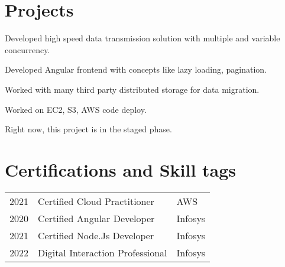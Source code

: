 \documentclass[]{deedy-resume-openfont}
\begin{document}
\begin{minipage}[t]{0.60\textwidth}
\section{Projects}

\begin{tightemize}
\item Developed high speed data transmission solution with multiple and variable concurrency.
\item Developed Angular frontend with concepts like lazy loading, pagination.
\item Worked with many third party distributed storage for data migration.
\item Worked on EC2, S3, AWS code deploy.
\item Right now, this project is in the staged phase.
\end{tightemize}
\sectionsep




\section{Certifications and Skill tags} 

\begin{tabular}{rll}
2021 	& Certified Cloud Practitioner    & AWS\\
2020   & Certified Angular Developer   & Infosys\\
2021   & Certified Node.Js Developer  & Infosys\\
2022    & Digital Interaction Professional & Infosys\\

\end{tabular}
\sectionsep

\end{minipage} 
\end{document}
